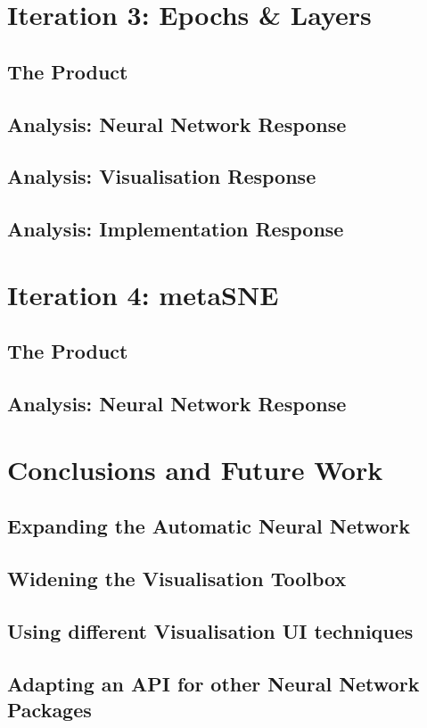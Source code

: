 \documentclass[a4paper,11pt,titlepage]{article}
\begin{document}
\section{Iteration 3: Epochs \& Layers}
	\subsection{The Product}	
	\subsection{Analysis: Neural Network Response}
	\subsection{Analysis: Visualisation Response}
	\subsection{Analysis: Implementation Response}
	
\section{Iteration 4: metaSNE}
	\subsection{The Product}
	\subsection{Analysis: Neural Network Response}
	
\section{Conclusions and Future Work}
	\subsection{Expanding the Automatic Neural Network}		
	\subsection{Widening the Visualisation Toolbox}
	\subsection{Using different Visualisation UI techniques}	
	\subsection{Adapting an API for other Neural Network Packages}
	
\end{document}
